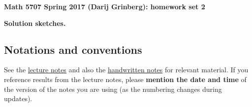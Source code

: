 \documentclass[numbers=enddot,12pt,final,onecolumn,notitlepage]{scrartcl}%
\theoremstyle{definition}
\begin{document}
\begin{center}
\textbf{Math 5707 Spring 2017 (Darij Grinberg): homework set 2}

\textbf{Solution sketches.}
\end{center}

\tableofcontents

\subsection{Notations and conventions}

See the
\href{http://www-users.math.umn.edu/~dgrinber/5707s17/nogra.pdf}{lecture notes}
and also the
\href{http://www-users.math.umn.edu/~dgrinber/5707s17/}{handwritten notes}
for relevant material.
If you reference results from the lecture notes, please \textbf{mention the date and time} of the version of the notes you are using (as the numbering changes during updates).
\end{document}
